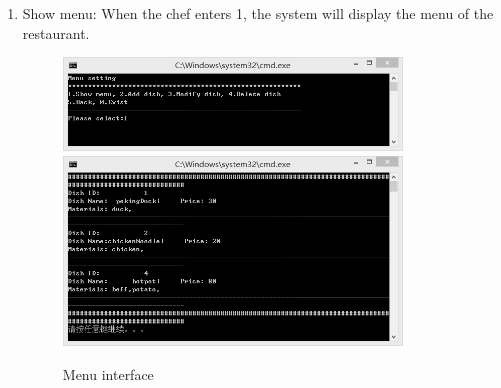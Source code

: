 \documentclass{article}
\begin{document}
\begin{enumerate}
    \item Show menu:\newline 
    When the chef enters 1, the system will display the menu of the restaurant.
        \begin{figure}[H]
        \centering
        \includegraphics[width=0.85\textwidth]{Q/1/Q_1a.jpg}
        \includegraphics[width=0.85\textwidth]{Q/1/Q_1b.jpg}
        \caption{Menu interface}
        \end{figure}
        

\end{enumerate}
\end{document}
